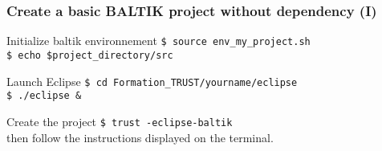 \documentclass[10pt, hyperref={unicode=true,pdfusetitle, bookmarks=true,bookmarksnumbered=false,bookmarksopen=false, breaklinks=false,pdfborder={0 0 1},backref=true,colorlinks=true,linkcolor=darkblue,pageanchor, urlcolor=darkblue}]{beamer}
\begin{document}


\begin{frame}
\frametitle{Create a basic BALTIK project without dependency (I)}

\begin{block}{Initialize baltik environnement}
 \texttt{\$ source env\_my\_project.sh } \\
 \texttt{\$ echo \$project\_directory/src }
\end{block}

\begin{exampleblock}{Launch Eclipse}
\texttt{\$ cd Formation\_TRUST/yourname/eclipse } \\
\texttt{\$ ./eclipse \& }
\end{exampleblock}

\begin{exampleblock}{Create the project}
\texttt{\$ trust -eclipse-baltik} \\
then follow the instructions displayed on the terminal.
\end{exampleblock}

\end{frame}
\end{document}
